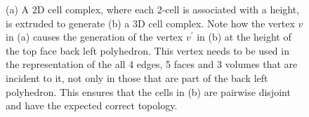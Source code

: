 \begin{figure}[tbp]
\centering
{}
{}
\caption[Extrusion from 2D to 3D]{(a) A 2D cell complex, where each 2-cell is associated with a height, is extruded to generate (b) a 3D cell complex. Note how the vertex $v$ in (a) causes the generation of the vertex $v^\prime$ in (b) at the height of the top face back left polyhedron.
This vertex needs to be used in the representation of the all 4 edges, 5 faces and 3 volumes that are incident to it, not only in those that are part of the back left polyhedron. This ensures that the cells in (b) are pairwise disjoint and have the expected correct topology.}
\label{fig:extrusion}
\end{figure}

